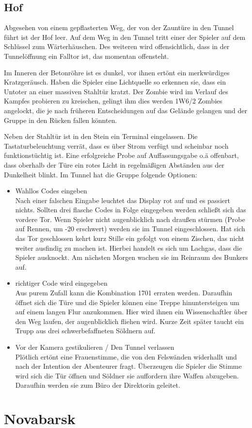 \documentclass{include/protokollclass}
\begin{document}
\subsection{Hof}

Abgesehen von einem gepflasterten Weg, der von der Zauntüre in den Tunnel führt ist der Hof leer. Auf dem Weg in den Tunnel tritt einer der Spieler auf dem Schlüssel zum Wärterhäuschen. Des weiteren wird offensichtlich, dass in der Tunnelöffnung ein Falltor ist, das momentan offensteht.

Im Inneren der Betonröhre ist es dunkel, vor ihnen ertönt ein merkwürdiges Kratzgeräusch. Haben die Spieler eine Lichtquelle so erkennen sie, dass ein Untoter an einer massiven Stahltür kratzt.
Der Zombie wird im Verlauf des Kampfes probieren zu kreischen, gelingt ihm dies werden 1W6/2 Zombies angelockt, die je nach früheren Entscheidungen auf das Gelände gelangen und der Gruppe in den Rücken fallen könnten.

\begin{center}
  
\end{center}

Neben der Stahltür ist in den Stein ein Terminal eingelassen. Die Tastaturbeleuchtung verrät, dass es über Strom verfügt und scheinbar noch funktionstüchtig ist.
Eine erfolgreiche Probe auf Auffassungsgabe o.ä offenbart, dass oberhalb der Türe ein rotes Licht in regelmäßigen Abständen aus der Dunkelheit blinkt.
Im Tunnel hat die Gruppe folgende Optionen:

\begin{itemize}
  \item Wahllos Codes eingeben
  \\Nach einer falschen Eingabe leuchtet das Display rot auf und es passiert nichts. Sollten drei flasche Codes in Folge eingegeben werden schließt sich das vordere Tor.
  Wenn Spieler nicht augenblicklich nach draußen stürmen (Probe auf Rennen, um -20 erschwert) werden sie im Tunnel eingeschlossen.
  Hat sich das Tor geschlossen kehrt kurz Stille ein gefolgt von einem Zischen, das nicht weiter ausfindig zu machen ist.
  Hierbei handelt es sich um Lachgas, dass die Spieler ausknockt. Am nächsten Morgen wachen sie im Reinraum des Bunkers auf.

  \item richtiger Code wird eingegeben
  \\Aus purem Zufall kann die Kombination 1701 erraten werden. Daraufhin öffnet sich die Türe und die Spieler können eine Treppe hinuntersteigen um auf einem langen Flur anzukommen. Hier wird ihnen ein Wissenschaftler über den Weg laufen, der augenblicklich fliehen wird. Kurze Zeit später taucht ein Trupp aus drei schwerbefaffneten Söldnern auf.

  \item Vor der Kamera gestikulieren / Den Tunnel verlassen
  \\Plötlich ertönt eine Frauenstimme, die von den Felswänden widerhallt und nach der Intention der Abenteurer fragt. Überzeugen die Spieler die Stimme wird sich die Tür öffnen und Söldner sie auffordern ihre Waffen abzugeben. Daraufhin werden sie zum Büro der Direktorin geleitet.
\end{itemize}

\section{Novabarsk}
\end{document}
